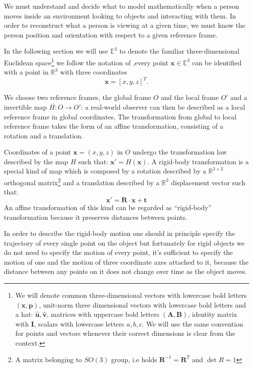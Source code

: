 \documentclass[acmtocl,acmnow]{acmtrans2m}
\begin{document}
We must understand and decide what to model mathematically when a person moves inside an environment looking to objects and interacting with them.
In order to reconstruct what a person is viewing at a given time, we must know the person position and orientation with respect to a given reference frame.

In the following section we will use $\mathbb{E}^3$ to denote the familiar three-dimensional Euclidean space\footnote
{
We will denote common three-dimensional vectors with lowercase bold letters $(\mathbf{x}, \mathbf{p})$, unit-norm three dimensional vectors with 
lowercase bold letters and a hat: $\mathbf{\hat{u}},\mathbf{\hat{v}}$,  matrices with uppercase bold letters $(\mathbf{A}, \mathbf{B})$, identity matrix with $\mathbf{I}$,
 scalars with lowercase letters $a,b,c$. We will use the same convention for points and vectors whenever their correct dimensions is clear from the context.
} we follow the notation of \cite[Soatto]{Ma:2003:IVI:971144},every point $\mathbf{x} \in \mathbb{E}^3$ can
be identified with a point in $\mathbb{R}^3$ with three coordinates $$\mathbf{x} = [x,y,z]^T.$$

We choose two reference frames, the global frame $O$ and the local frame $O'$ and a invertible map $H : O \rightarrow O'$: a real-world observer can then be described as a local reference frame in global coordinates.
The transformation from global to local reference frame takes the form of an affine transformation, consisting of a rotation and a translation.

Coordinates of a point $\mathbf{x}=(x,y,z)$ in $O$ undergo the transformation law described by the map $H$ such that: $\mathbf{x}' = H( \mathbf{x})$. A rigid-body transformation is a special kind of 
map which is composed by a rotation described by a $\mathbb{R}^{3\times 3}$ orthogonal matrix\footnote{A matrix belonging to $SO(3)$ group, i.e holds $\mathbf{R}^{-1}=\mathbf{R}^T$ and $\det{R}=1$} and a translation described by a $\mathbb{R}^3$ displacement vector such that:
\begin{equation}
\label{eq:affinemotion}
 \mathbf{x}' = \mathbf{R} \cdot \mathbf{x} + \mathbf{t}
\end{equation}
An affine transformation of this kind can be regarded as ``rigid-body'' transformation because
it preserves distances between points.

In order to describe the rigid-body motion one should in
principle specify the trajectory of every single point on the object but
fortunately for rigid objects we do not need to specify the
motion of every point, it's sufficient to specify the motion of one and the
motion of three coordinate axes attached to it, because the distance
between any points on it does not change over time as the object moves.
\end{document}
